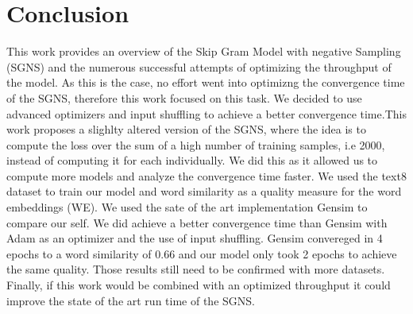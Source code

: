 
\section{Conclusion}\label{sec:conclusion}

This work provides an overview of the Skip Gram Model with negative Sampling (SGNS) and the numerous successful attempts of optimizing the throughput of the model. As this is the case, no effort went into optimizng the convergence time of the SGNS, therefore this work focused on this task. We decided to use advanced optimizers and input shuffling to achieve a better convergence time.This work proposes a slighlty altered version of the SGNS, where the idea is to compute the loss over the sum of a high number of training samples, i.e 2000,  instead of computing it for each individually.  We did this as it allowed us to compute more models and analyze the convergence time faster. We used the text8 dataset to train our model and  word similarity as a quality measure for the word embeddings (WE). We used the sate of the art implementation Gensim to compare our self. We did achieve a better convergence time than Gensim with Adam as an optimizer and the use of input shuffling. Gensim convereged in 4 epochs to a word similarity of 0.66 and our model only took 2 epochs to achieve the same quality. Those results still need to be confirmed with more datasets. Finally, if this work would be combined with an optimized throughput it  could improve the state of the art run time of the SGNS.